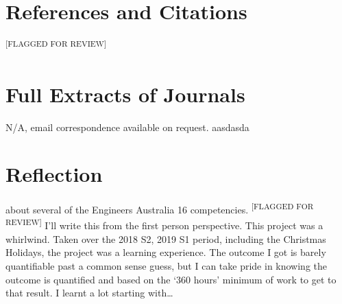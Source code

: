 \documentclass{UoNMCHA}
\newcommand{\flagforreview}{\textsuperscript{\color{red} [FLAGGED FOR REVIEW]}}
\numberwithin{equation}{section}
\begin{document}
\clearpage \section{References and Citations}\label{sec:RefCite}

 
 \flagforreview %

\newpage
\appendix
\clearpage \section{Full Extracts of Journals}
N/A, email correspondence available on request. aasdasda

\clearpage \section{Reflection}
about several of the Engineers Australia 16 competencies.  \flagforreview
I'll write this from the first person perspective.
This project was a whirlwind. Taken over the 2018 S2, 2019 S1 period, including the Christmas Holidays, the project was a learning experience. The outcome I got is barely quantifiable past a common sense guess, but I can take pride in knowing the outcome is quantified and based on the `360 hours' minimum of work to get to that result. I learnt a lot starting with\dots
\end{document}
